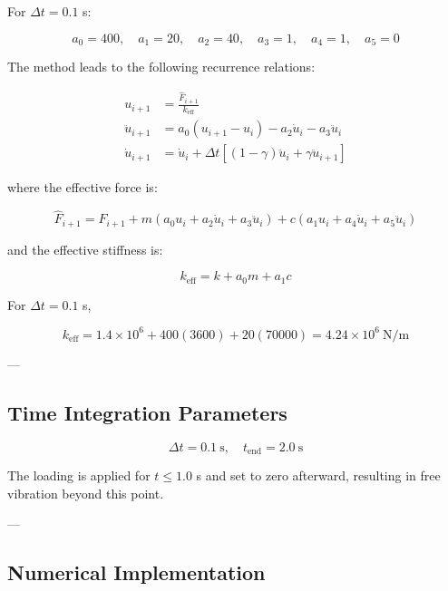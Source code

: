 For $\Delta t = 0.1$ s:

\begin{equation}
a_0 = 400, \quad a_1 = 20, \quad a_2 = 40, \quad a_3 = 1, \quad a_4 = 1, \quad a_5 = 0
\end{equation}

The method leads to the following recurrence relations:

\begin{align}
u_{i+1} &= \frac{\hat{F}_{i+1}}{k_{\text{eff}}} \\
\ddot{u}_{i+1} &= a_0(u_{i+1} - u_i) - a_2 \dot{u}_i - a_3 \ddot{u}_i \\
\dot{u}_{i+1} &= \dot{u}_i + \Delta t \left[(1-\gamma)\ddot{u}_i + \gamma \ddot{u}_{i+1} \right]
\end{align}

where the effective force is:

\begin{equation}
\hat{F}_{i+1} =
F_{i+1}
+ m(a_0 u_i + a_2 \dot{u}_i + a_3 \ddot{u}_i)
+ c(a_1 u_i + a_4 \dot{u}_i + a_5 \ddot{u}_i)
\end{equation}

and the effective stiffness is:

\begin{equation}
k_{\text{eff}} = k + a_0 m + a_1 c
\end{equation}

For $\Delta t = 0.1$ s,

\begin{equation}
k_{\text{eff}} = 1.4 \times 10^6 + 400(3600) + 20(70000) = 4.24 \times 10^6 \ \text{N/m}
\end{equation}

---

\subsection{Time Integration Parameters}

\begin{equation}
\Delta t = 0.1 \ \text{s}, \quad t_{\text{end}} = 2.0 \ \text{s}
\end{equation}

The loading is applied for $t \leq 1.0$ s and set to zero afterward, resulting in free vibration beyond this point.

---

\subsection{Numerical Implementation}

